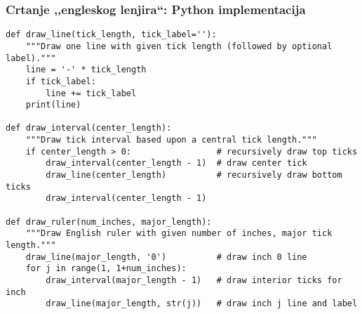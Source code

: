 \documentclass[compress,aspectratio=169]{beamer}
\begin{document}
\begin{frame}[fragile,shrink=10]
  \frametitle{Crtanje ,,engleskog lenjira``: Python implementacija}
\begin{verbatim}
def draw_line(tick_length, tick_label=''):
    """Draw one line with given tick length (followed by optional label)."""
    line = '-' * tick_length
    if tick_label:
        line += tick_label
    print(line)

def draw_interval(center_length):
    """Draw tick interval based upon a central tick length."""
    if center_length > 0:                 # recursively draw top ticks
        draw_interval(center_length - 1)  # draw center tick
        draw_line(center_length)          # recursively draw bottom ticks
        draw_interval(center_length - 1)

def draw_ruler(num_inches, major_length):
    """Draw English ruler with given number of inches, major tick length."""
    draw_line(major_length, '0')          # draw inch 0 line
    for j in range(1, 1+num_inches):
        draw_interval(major_length - 1)   # draw interior ticks for inch
        draw_line(major_length, str(j))   # draw inch j line and label
\end{verbatim}  
\end{frame}
\end{document}
